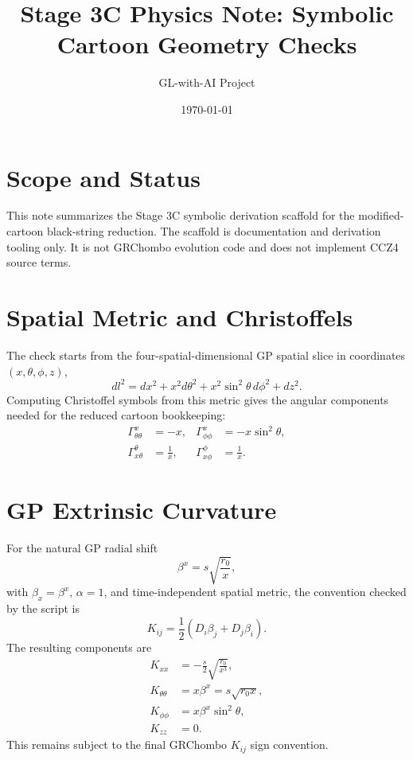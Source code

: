 \documentclass[11pt]{article}
\title{Stage 3C Physics Note: Symbolic Cartoon Geometry Checks}
\author{GL-with-AI Project}
\date{\today}
\begin{document}
\maketitle

\section{Scope and Status}

This note summarizes the Stage 3C symbolic derivation scaffold for the
modified-cartoon black-string reduction. The scaffold is documentation and
derivation tooling only. It is not GRChombo evolution code and does not
implement CCZ4 source terms.

\section{Spatial Metric and Christoffels}

The check starts from the four-spatial-dimensional GP spatial slice in
coordinates \((x,\theta,\phi,z)\),
\begin{equation}
  dl^2 = dx^2 + x^2 d\theta^2 + x^2\sin^2\theta\,d\phi^2 + dz^2 .
\end{equation}
Computing Christoffel symbols from this metric gives the angular components
needed for the reduced cartoon bookkeeping:
\begin{align}
  \Gamma^x_{\theta\theta} &= -x, &
  \Gamma^x_{\phi\phi} &= -x\sin^2\theta,\\
  \Gamma^\theta_{x\theta} &= \frac{1}{x}, &
  \Gamma^\phi_{x\phi} &= \frac{1}{x}.
\end{align}

\section{GP Extrinsic Curvature}

For the natural GP radial shift
\begin{equation}
  \beta^x=s\sqrt{\frac{r_0}{x}},
\end{equation}
with \(\beta_x=\beta^x\), \(\alpha=1\), and time-independent spatial metric,
the convention checked by the script is
\begin{equation}
  K_{ij}=\frac{1}{2}\left(D_i\beta_j+D_j\beta_i\right).
\end{equation}
The resulting components are
\begin{align}
  K_{xx} &= -\frac{s}{2}\sqrt{\frac{r_0}{x^3}},\\
  K_{\theta\theta} &= x\beta^x=s\sqrt{r_0x},\\
  K_{\phi\phi} &= x\beta^x\sin^2\theta,\\
  K_{zz} &= 0.
\end{align}
This remains subject to the final GRChombo \(K_{ij}\) sign convention.
\end{document}
